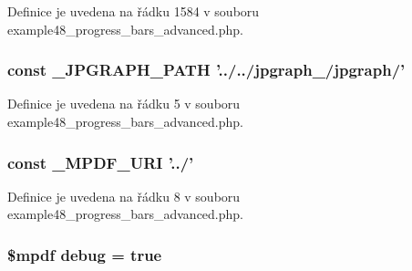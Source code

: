 Definice je uvedena na řádku 1584 v souboru example48\-\_\-progress\-\_\-bars\-\_\-advanced.\-php.

\hypertarget{example48__progress__bars__advanced_8php_aa256b12517ab22b9550c150865a689c4}{
\subsubsection[{\-\_\-\-J\-P\-G\-R\-A\-P\-H\-\_\-\-P\-A\-T\-H}]{\setlength{\rightskip}{0pt plus 5cm}const \-\_\-\-J\-P\-G\-R\-A\-P\-H\-\_\-\-P\-A\-T\-H '../../jpgraph\-\_/jpgraph/'}}\label{example48__progress__bars__advanced_8php_aa256b12517ab22b9550c150865a689c4}


Definice je uvedena na řádku 5 v souboru example48\-\_\-progress\-\_\-bars\-\_\-advanced.\-php.

\hypertarget{example48__progress__bars__advanced_8php_a1ff50e3d84f8270d034f2e9d99c147c0}{
\subsubsection[{\-\_\-\-M\-P\-D\-F\-\_\-\-U\-R\-I}]{\setlength{\rightskip}{0pt plus 5cm}const \-\_\-\-M\-P\-D\-F\-\_\-\-U\-R\-I '../'}}\label{example48__progress__bars__advanced_8php_a1ff50e3d84f8270d034f2e9d99c147c0}


Definice je uvedena na řádku 8 v souboru example48\-\_\-progress\-\_\-bars\-\_\-advanced.\-php.

\hypertarget{example48__progress__bars__advanced_8php_a200a436f1833a712239f1ae5bec608db}{
\subsubsection[{debug}]{\setlength{\rightskip}{0pt plus 5cm}\$mpdf debug = true}}\label{example48__progress__bars__advanced_8php_a200a436f1833a712239f1ae5bec608db}



